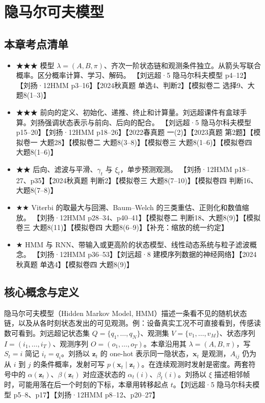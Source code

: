 \documentclass[UTF8,a4paper,zihao=-4,fontset=fandol]{ctexrep}
\begin{document}
\chapter{隐马尔可夫模型}

\section{本章考点清单}
\begin{itemize}
\item ★★★ 模型 $\lambda=(A,B,\pi)$、齐次一阶状态链和观测条件独立。从箭头写联合概率。区分概率计算、学习、解码。 【刘远超·5 隐马尔科夫模型 p4–12】【刘扬·12HMM p3–16】【2024秋真题 单选4、判断2】【模拟卷二 选择9、大题8(1–3)】
\item ★★★ 前向的定义、初始化、递推、终止和计算量。刘远超课件有盒球手算。刘扬强调状态表示与前向、后向的配合。 【刘远超·5 隐马尔科夫模型 p15–20】【刘扬·12HMM p18–26】【2022春真题 一(2)】【2023真题 第2题】【模拟卷一 大题28】【模拟卷二 大题8(3–8)】【模拟卷三 大题8(1–6)】【模拟卷四 大题8(1–6)】
\item ★★ 后向、滤波与平滑、$\gamma_t$ 与 $\xi_t$，单步预测观测。 【刘扬·12HMM p18–27、p35】【2024秋真题 判断2】【模拟卷三 大题8(7–10)】【模拟卷四 判断16、大题8(7–8)】
\item ★★ Viterbi 的取最大与回溯、Baum–Welch 的三类重估、正则化和数值缩放。 【刘扬·12HMM p28–34、p40–41】【模拟卷二 判断18、大题8(9)】【模拟卷三 大题8(11)】【模拟卷四 大题8(6–9)】【补充：缩放的统一约定】
\item ★ HMM 与 RNN、带输入或更高阶的状态模型、线性动态系统与粒子滤波概念。 【刘扬·12HMM p36–53】【刘远超·8 建模序列数据的神经网络】【2024秋真题 单选4】【模拟卷四 大题8(9)】
\end{itemize}

\section{核心概念与定义}
隐马尔可夫模型（Hidden Markov Model, HMM）描述一条看不见的随机状态链，以及从各时刻状态发出的可见观测。例：设备真实工况不可直接看到，传感读数可看到。刘远超记状态集 $Q=\{q_1,\ldots,q_N\}$、观测集 $V=\{v_1,\ldots,v_M\}$、状态序列 $I=(i_1,\ldots,i_T)$、观测序列 $O=(o_1,\ldots,o_T)$。本章沿用其 $\lambda=(A,B,\pi)$，写 $S_t=i$ 简记 $i_t=q_i$。刘扬以 $\bm z_t$ 的 one-hot 表示同一隐状态，$\bm x_t$ 是观测，$A_{ij}$ 仍为从 $i$ 到 $j$ 的条件概率，发射可写 $p(\bm x_t\mid \bm z_t)$。在连续观测时发射是密度。两套符号中的 $\alpha(\bm z_t)$、$\beta(\bm z_t)$ 对应逐状态的 $\alpha_t(i)$、$\beta_t(i)$。刘扬以 $\xi$ 描述相邻帧时，可能用落在后一个时刻的下标，本章用转移起点 $t$。【刘远超·5 隐马尔科夫模型 p5–8、p17】【刘扬·12HMM p8–12、p20–27】
\end{document}
